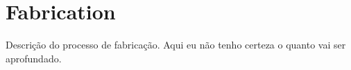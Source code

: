 \chapter{Fabrication}

Descrição do processo de fabricação. Aqui eu não tenho certeza o quanto vai ser aprofundado.  